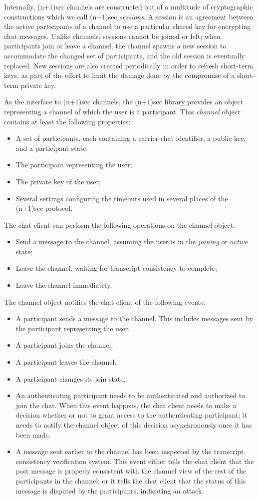 \documentclass{article}
\begin{document}
Internally, (n+1)sec channels are constructed out of a multitude of cryptographic constructions which we call (n+1)sec \emph{sessions}.
A session is an agreement between the active participants of a channel to use a particular shared key for encrypting chat messages.
Unlike channels, sessions cannot be joined or left; when participants join or leave a channel, the channel spawns a new session to accommodate the changed set of participants, and the old session is eventually replaced.
New sessions are also created periodically in order to refresh short-term keys, as part of the effort to limit the damage done by the compromise of a short-term private key.

As the interface to (n+1)sec channels, the (n+1)sec library provides an object representing a channel of which the user is a participant.
This \emph{channel} object contains at least the following properties:
\begin{itemize}
\item A set of participants, each containing a carrier-chat identifier, a public key, and a participant state;
\item The participant representing the user;
\item The private key of the user;
\item Several settings configuring the timeouts used in several places of the (n+1)sec protocol.
\end{itemize}
The chat client can perform the following operations on the channel object:
\begin{itemize}
\item Send a message to the channel, assuming the user is in the \emph{joining} or \emph{active} state;
\item Leave the channel, waiting for transcript consistency to complete;
\item Leave the channel immediately.
\end{itemize}
The channel object notifies the chat client of the following events:
\begin{itemize}
\item A participant sends a message to the channel. This includes messages sent by the participant representing the user.
\item A participant joins the channel.
\item A participant leaves the channel.
\item A participant changes its join state.
\item An authenticating participant needs to be authenticated and authorized to join the chat. When this event happens, the chat client needs to make a decision whether or not to grant access to the authenticating participant; it needs to notify the channel object of this decision asynchronously once it has been made.
\item A message sent earlier to the channel has been inspected by the transcript consistency verification system. This event either tells the chat client that the past message is properly consistent with the channel view of the rest of the participants in the channel; or it tells the chat client that the status of this message is disputed by the participants, indicating an attack.
\end{itemize}
\end{document}
